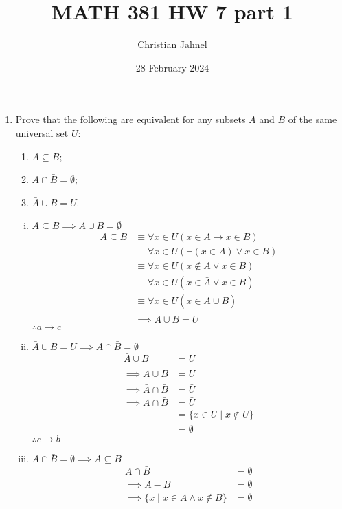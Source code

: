 \documentclass[letterpaper, 12pt]{article}
\title{MATH 381 HW 7 part 1}
\author{Christian Jahnel}
\date{28 February 2024}
\newcommand{\then}{\rightarrow}
\newcommand{\0}{\emptyset}
\begin{document}
\maketitle
\begin{enumerate}
\item Prove that the following are equivalent for any subsets $A$ and $B$ of the same universal 
set $U$:
\begin{enumerate}
\item $A \subseteq B$;
\item $A \cap \bar{B} = \0$;
\item $\bar{A} \cup B = U$.
\end{enumerate}
\begin{enumerate}[i.]
    \item $A \subseteq B \implies A \cup \bar{B} = \0$
    \begin{align*}
        A \subseteq B &\equiv \forall x \in U(x \in A \then x \in B) \\
        &\equiv \forall x \in U(\neg(x \in A) \vee x \in B) \\
        &\equiv \forall x \in U(x \notin A \vee x \in B) \\
        &\equiv \forall x \in U(x \in \bar{A} \vee x \in B) \\
        &\equiv \forall x \in U(x \in \bar{A} \cup B) \\
        &\implies \bar{A} \cup B = U
    \end{align*}
    $\therefore a \then c$
    \item $\bar{A} \cup B = U \implies A \cap \bar{B} = \0$
    \begin{align*}
        \bar{A} \cup B &= U \\
        \implies \overline{\bar{A} \cup B} &= \bar{U} \\
        \implies \overline{\bar{A}} \cap \bar{B} &= \bar{U} \\
        \implies A \cap \bar{B} &= \bar{U} \\
        &= \{x \in U \mid x \notin U\} \\
        &= \0
    \end{align*}
    $\therefore c \then b$
    \item $A \cap \bar{B} = \0 \implies A \subseteq B$
    \begin{align*}
        A \cap \bar{B} &= \0 \\
        \implies A - B &= \0 \\
        \implies \{x \mid x \in A \wedge x \notin B\} &= \0
    \end{align*}

\end{enumerate}
\end{enumerate}
\end{document}
